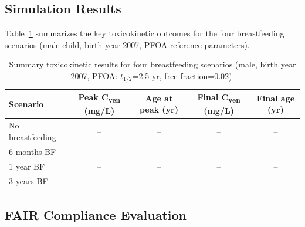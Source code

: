 \documentclass[preprint,12pt]{elsarticle}
\begin{document}
\begin{linenumbers}
\subsection{Simulation Results}


Table~\ref{tab:results_summary} summarizes the key toxicokinetic
outcomes for the four breastfeeding scenarios (male child, birth
year 2007, PFOA reference parameters).

\begin{table}[h]
\centering
\caption{Summary toxicokinetic results for four breastfeeding scenarios
(male, birth year 2007, PFOA: $t_{1/2}$=2.5 yr, free fraction=0.02).}
\label{tab:results_summary}
\begin{tabular}{lcccc}
\toprule
\textbf{Scenario} & \textbf{Peak C\textsubscript{ven} (mg/L)} &
\textbf{Age at peak (yr)} & \textbf{Final C\textsubscript{ven} (mg/L)} &
\textbf{Final age (yr)} \\
\midrule
No breastfeeding & -- & -- & -- & -- \\
6 months BF      & -- & -- & -- & -- \\
1 year BF        & -- & -- & -- & -- \\
3 years BF       & -- & -- & -- & -- \\
\bottomrule
\end{tabular}
\end{table}


\subsection{FAIR Compliance Evaluation}



\end{linenumbers}
\end{document}
